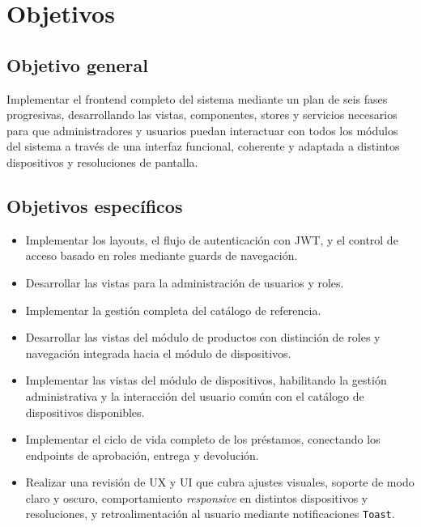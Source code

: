 \section{Objetivos}

\subsection{Objetivo general}

Implementar el frontend completo del sistema mediante un plan de seis fases 
progresivas, desarrollando las vistas, componentes, stores y servicios necesarios 
para que administradores y usuarios puedan interactuar con todos los módulos del 
sistema a través de una interfaz funcional, coherente y adaptada a distintos 
dispositivos y resoluciones de pantalla.

\subsection{Objetivos específicos}

\begin{itemize}
	\item Implementar los layouts, el flujo 
	de autenticación con JWT, y el control de acceso basado en roles mediante guards 
	de navegación.
	
	\item Desarrollar las vistas para 
	la administración de usuarios y roles.
	
	\item Implementar la gestión completa del catálogo de 
	referencia.
	
	\item Desarrollar las vistas del módulo de productos con distinción de roles y navegación integrada hacia 
	el módulo de dispositivos.
	
	\item Implementar las vistas del módulo de dispositivos, habilitando la gestión administrativa y la 
	interacción del usuario común con el catálogo de dispositivos disponibles.
	
	\item Implementar el ciclo de vida completo de los préstamos, conectando los endpoints de aprobación, entrega y devolución.
	
	\item Realizar una revisión de UX y UI que cubra ajustes visuales, 
	soporte de modo claro y oscuro, comportamiento \textit{responsive} en distintos 
	dispositivos y resoluciones, y retroalimentación al usuario mediante 
	notificaciones \texttt{Toast}.
\end{itemize}